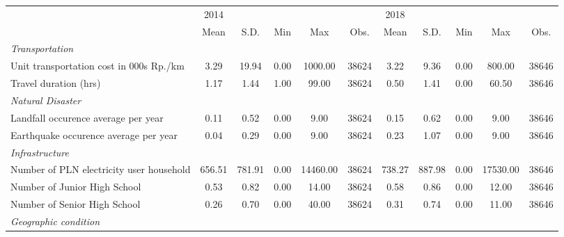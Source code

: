 \begin{tabular}{l*{2}{ccccc}}
\toprule
                &     2014&         &         &         &         &     2018&         &         &         &         \\
                &     Mean&     S.D.&      Min&      Max&     Obs.&     Mean&     S.D.&      Min&      Max&     Obs.\\
\midrule
\emph{Transportation}&         &         &         &         &         &         &         &         &         &         \\
\hspace{0.25cm} Unit transportation cost in 000s Rp./km&     3.29&    19.94&     0.00&  1000.00&    38624&     3.22&     9.36&     0.00&   800.00&    38646\\
\hspace{0.25cm} Travel duration (hrs)&     1.17&     1.44&     1.00&    99.00&    38624&     0.50&     1.41&     0.00&    60.50&    38646\\
\emph{Natural Disaster}&         &         &         &         &         &         &         &         &         &         \\
\hspace{0.25cm} Landfall occurence average per year&     0.11&     0.52&     0.00&     9.00&    38624&     0.15&     0.62&     0.00&     9.00&    38646\\
\hspace{0.25cm} Earthquake occurence average per year&     0.04&     0.29&     0.00&     9.00&    38624&     0.23&     1.07&     0.00&     9.00&    38646\\
\emph{Infrastructure}&         &         &         &         &         &         &         &         &         &         \\
\hspace{0.25cm} Number of PLN electricity user household&   656.51&   781.91&     0.00& 14460.00&    38624&   738.27&   887.98&     0.00& 17530.00&    38646\\
\hspace{0.25cm} Number of Junior High School&     0.53&     0.82&     0.00&    14.00&    38624&     0.58&     0.86&     0.00&    12.00&    38646\\
\hspace{0.25cm} Number of Senior High School&     0.26&     0.70&     0.00&    40.00&    38624&     0.31&     0.74&     0.00&    11.00&    38646\\
\emph{Geographic condition}&         &         &         &         &         &         &         &         &         &         \\

\end{tabular}
